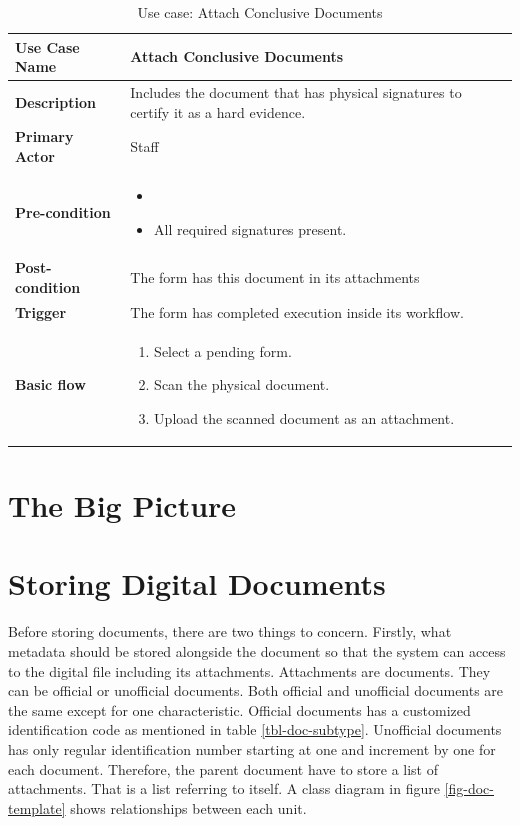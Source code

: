 \begin{table}
	\centering
	\caption{Use case: Attach Conclusive Documents}
	\label{tbl-usecase:attach-conclusive-documents}
	\begin{tabular}{|l|L{9cm}|}
		\hline
		\textbf{Use Case Name} & Attach Conclusive Documents \\
		\hline
		
		\textbf{Description} & Includes the document that has physical signatures to certify it as a hard evidence. \\
		\textbf{Primary Actor} & Staff \\
		\textbf{Pre-condition} & 
		\begin{itemize}
			\item \alreadylogin
			\item All required signatures present.
		\end{itemize} \\
		
		\textbf{Post-condition} & The form has this document in its attachments \\
		\textbf{Trigger} & The form has completed execution inside its workflow. \\
		\textbf{Basic flow} & 
		\begin{enumerate}
			\item Select a pending form.
			\item Scan the physical document.
			\item Upload the scanned document as an attachment.
		\end{enumerate} \\
		\hline
	\end{tabular}
\end{table}

\section{The Big Picture}


\section{Storing Digital Documents}
Before storing documents, there are two things to concern.
Firstly, what metadata should be stored alongside the document so that the system can access to the digital file including its attachments.
Attachments are documents.
They can be official or unofficial documents.
Both official and unofficial documents are the same except for one characteristic.
Official documents has a customized identification code as mentioned in table \ref{tbl-doc-subtype}.
Unofficial documents has only regular identification number starting at one and increment by one for each document.
Therefore, the parent document have to store a list of attachments.
That is a list referring to itself.
A class diagram in figure \ref{fig-doc-template} shows relationships between each unit.

